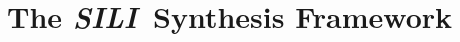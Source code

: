 \documentclass{llncs}
\newcommand{\synname}{\emph{SILI}}
\begin{document}
\section{The \synname\ Synthesis Framework}\label{sec:formal_system}



\end{document}
